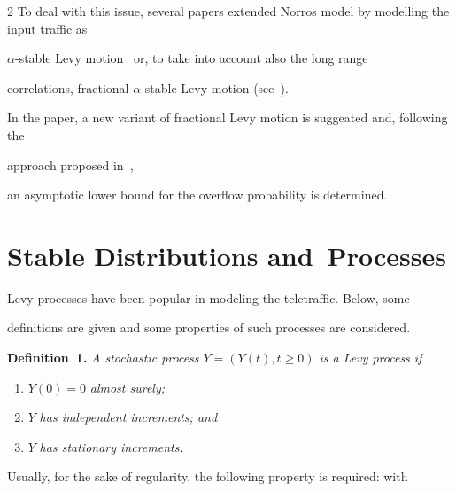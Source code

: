 \begin{multicols}{2}
To deal with this issue, several papers extended Norros model by modelling the input traffic as 

$\alpha$-stable Levy motion~\cite{13-nik, 14-nik} or, to take into account also the long range 

correlations, fractional $\alpha$-stable Levy motion (see~\cite{16-nik, 15-nik}).



In the paper, a new variant of  fractional Levy motion is suggeated and, following the 

approach proposed in~\cite{10-nik},

an asymptotic lower bound for the overflow probability is determined. 





\section{Stable Distributions and~Processes}



\noindent

Levy processes have been popular in modeling the teletraffic. Below, some 

definitions are given and some properties of such processes are considered. 



\smallskip



\noindent

\textbf{Definition~1.} \textit{A stochastic process $Y = (Y(t), t\geq 0)$ is a Levy process if}

\begin{enumerate}[(1)]

\item $Y(0) = 0$ \textit{almost surely;} 

\item

 $Y$ \textit{has independent increments; and}  

\item

$Y$ \textit{has stationary increments}. 

\end{enumerate}



\smallskip



Usually, for the sake of regularity,  the following property is required: with 


\end{multicols}
